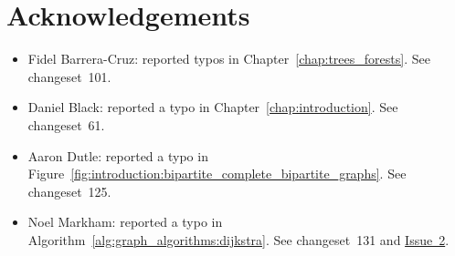 
\chapter{Acknowledgements}

\begin{itemize}
\item Fidel Barrera-Cruz: reported typos in
  Chapter~\ref{chap:trees_forests}. See changeset~101.

\item Daniel Black: reported a typo in
  Chapter~\ref{chap:introduction}. See changeset~61.

\item Aaron Dutle: reported a typo in
  Figure~\ref{fig:introduction:bipartite_complete_bipartite_graphs}. See
  changeset~125.

\item Noel Markham: reported a typo in
  Algorithm~\ref{alg:graph_algorithms:dijkstra}. See changeset~131 and
  \href{http://code.google.com/p/graph-theory-algorithms-book/issues/detail?id=2}{Issue~2}.
\end{itemize}
